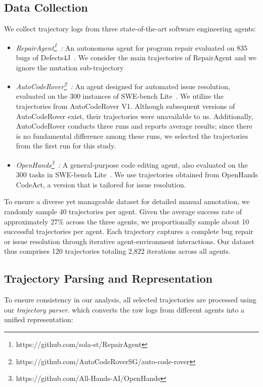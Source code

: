 \documentclass[conference,10pt]{IEEEtran}
\theoremstyle{definition}        %
\newcommand{\ra}{Repair\-Agent}
\newcommand{\oh}{Open\-Hands}
\newcommand{\acr}{Auto\-Code\-Rover}
\begin{document}
\subsection{Data Collection}
We collect trajectory logs from three state-of-the-art software engineering agents:
\begin{itemize}
	\item \emph{\ra{}\footnote{https://github.com/sola-st/RepairAgent}~\cite{icse2025-RepairAgent}:} An autonomous agent for program repair evaluated on 835 bugs of Defects4J~\cite{Just2014}. We consider the main trajectories of \ra{} and we ignore the mutation sub-trajectory
	\item \emph{\acr{}\footnote{https://github.com/AutoCodeRoverSG/auto-code-rover}~\cite{zhang2024autocoderover}:} An agent designed for automated issue resolution, evaluated on  the 300 instances of SWE-bench Lite~\cite{Jimenez2023}. We utilize the trajectories from \acr{} V1. Although subsequent versions of \acr{} exist, their trajectories were unavailable to us. Additionally, \acr{} conducts three runs and reports average results; since there is no fundamental difference among these runs, we selected the trajectories from the first run for this study.

	\item \emph{\oh{}\footnote{https://github.com/All-Hands-AI/OpenHands}~\cite{wang2024openhands}:} A general-purpose code editing agent, also evaluated on the 300 tasks in SWE-bench Lite~\cite{Jimenez2023}. We use trajectories obtained from OpenHands CodeAct, a version that is tailored for issue resolution.
\end{itemize}

To ensure a diverse yet manageable dataset for detailed manual annotation, we randomly sample 40 trajectories per agent. Given the average success rate of approximately 27\% across the three agents, we proportionally sample about 10 successful trajectories per agent. Each trajectory captures a complete bug repair or issue resolution through iterative agent-environment interactions. Our dataset thus comprises 120 trajectories totaling 2,822 iterations across all agents.





\subsection{Trajectory Parsing and Representation}

To ensure consistency in our analysis, all selected trajectories are processed using our \emph{trajectory parser}.
which converts the raw logs from different agents into a unified representation:
\end{document}
